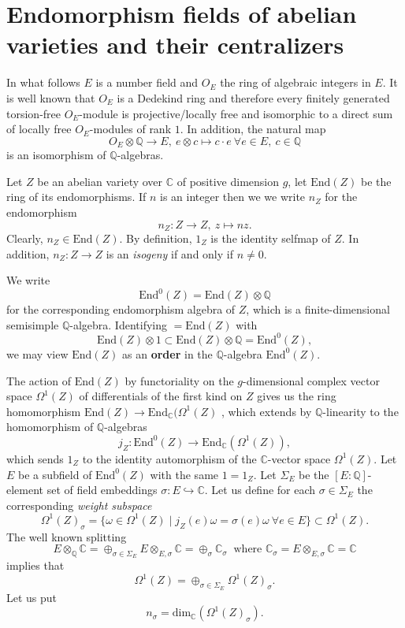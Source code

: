 \documentclass[12pt,a4paper,reqno]{amsart}
\def\Q{{\mathbb Q}}
\def\C{{\mathbb C}}
\def\End{\mathrm{End}}
\def\dim{\mathrm{dim}}
\theoremstyle{definition}
\begin{document}
\section{Endomorphism fields of abelian varieties and their centralizers}
\label{weightS}
In what follows $E$ is a number field and $O_E$ the ring of algebraic integers in $E$. It is well known that $O_E$
is a Dedekind ring and therefore every finitely generated torsion-free $O_E$-module is projective/locally free and isomorphic 
to a direct sum of locally free $O_E$-modules of rank $1$. In addition, the natural map
$$O_E\otimes \Q \to E, \ e\otimes c \mapsto c\cdot e \ \forall e\in E, \ c \in \Q$$
is an isomorphism of $\Q$-algebras.

Let $Z$ be an abelian variety over $\C$ of positive dimension $g$, let  $\End(Z)$ be the ring of its endomorphisms.
  If $n$ is an integer then we we write $n_Z$ for the endomorphism
$$n_Z: Z \to Z, \ z \mapsto nz.$$
Clearly, $n_Z \in \End(Z)$. By definition, $1_Z$ is the identity selfmap of $Z$. In addition,
$n_Z: Z \to Z$ is an {\sl isogeny} if and only if $n \ne 0$.

We write 
$$\End^0(Z)=\End(Z)\otimes\Q$$
for the corresponding endomorphism algebra of $Z$, which is a finite-dimensional semisimple $\Q$-algebra. Identifying $=\End(Z)$ with 
$$\End(Z)\otimes 1\subset \End(Z)\otimes\Q=\End^0(Z),$$
we may view $\End(Z)$ as an {\bf order} in the $\Q$-algebra $\End^0(Z)$.

The action of $\End(Z)$  by functoriality  on the $g$-dimensional complex vector space $\Omega^1(Z)$ of differentials of the first kind on $Z$ 
 gives us the ring homomorphism  $\End(Z) \to  \End_{\C}(\Omega^1(Z)$ \cite[Ch. 1, Sect. 2.8]{Shimura},
which extends by $\Q$-linearity to the homomorphism of $\Q$-algebras
\begin{equation}
\label{dif1kind}
j_Z:\End^0(Z)\to \End_{\C}(\Omega^1(Z)),
\end{equation}
which sends $1_Z$ to the identity automorphism of the $\C$-vector space $\Omega^1(Z)$.
Let $E$ be a  subfield of $\End^0(Z)$ with the same $1=1_Z$. Let $\Sigma_E$ be the $[E:\Q]$-element set of field embeddings $\sigma: E  \hookrightarrow \C$.
Let us define for each $\sigma\in \Sigma_E$ the corresponding {\sl weight subspace}
$$\Omega^1(Z)_{\sigma}=\{\omega \in \Omega^1(Z)\mid j_Z(e)\omega=\sigma(e)\omega \ \forall e \in E\}\subset \Omega^1(Z).$$
The well known splitting
$$E\otimes_{\Q}\C =\oplus_{\sigma\in \Sigma_E}E\otimes_{E,\sigma}\C=\oplus_{\sigma}\C_{\sigma} \ \text{ where  }\C_{\sigma}=E\otimes_{E,\sigma}\C=\C$$
implies that
$$\Omega^1(Z)=\oplus_{\sigma\in \Sigma_E}\Omega^1(Z)_{\sigma}.$$
Let us put
$$n_{\sigma}=\dim_{\C}(\Omega^1(Z)_{\sigma}).$$
\end{document}
